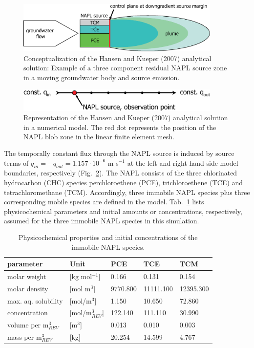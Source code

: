 \begin{figure}[htbp]
\centering
\includegraphics[width=0.9\textwidth]{C/figures/H&K_concept.eps}
\caption{Conceptualization of the Hansen and Kueper (2007) analytical solution: Example of a three component residual NAPL source zone in a moving groundwater body and source emission.}
\label{fig_HKAS_concept}
\end{figure}

\begin{figure}[htbp]
\centering
\includegraphics[width=0.9\textwidth]{C/figures/H&K_concept_FEM.eps}
\caption{Representation of the Hansen and Kueper (2007) analytical solution in a numerical model. The red dot represents the position of the NAPL blob zone in the linear finite element mesh.}
\label{fig_HKAS_FEM}
\end{figure}

The temporally constant flux through the NAPL source is induced by source terms of $q_{in} =-q_{out} = 1.157\cdot10^{-6}$ m s$^{-1}$ at the left and right hand side model boundaries, respectively (Fig.~\ref{fig_HKAS_FEM}). The NAPL consists of the three chlorinated hydrocarbon (CHC) species perchloroethene (PCE), trichloroethene (TCE) and tetrachloromethane (TCM). Accordingly, three immobile NAPL species plus three corresponding mobile species are defined in the model. Tab.~\ref{l_tab_benchmark_1d_HKAS_compprop} lists physicochemical parameters and initial amounts or concentrations, respectively, assumed for the three immobile NAPL species in this simulation.

\begin{table}[htbp]
\caption{Physicochemical properties and initial concentrations of the immobile NAPL species.}
\centering
\begin{tabular}{|l|l|l|l|l|}
\hline
parameter & Unit & PCE & TCE & TCM \\
\hline
molar weight & [kg mol$^{-1}$] & 0.166 & 0.131 & 0.154	\\
\hline
molar density & [mol m$^{3}$] & 9770.800 & 11111.100 & 12395.300\\	
\hline
max. aq. solubility & [mol/m$^{3}$] & 1.150 & 10.650 & 72.860\\
\hline
concentration & [mol/m$^{3}_{REV}$] & 122.140 & 111.110 & 30.990\\
\hline
volume per m$^{3}_{REV}$ & [m$^3$] & 0.013 & 0.010 & 0.003\\
\hline
mass per m$^{3}_{REV}$ & [kg] & 20.254 & 14.599 & 4.767\\
\hline
\end{tabular}
\label{l_tab_benchmark_1d_HKAS_compprop}
\end{table}

